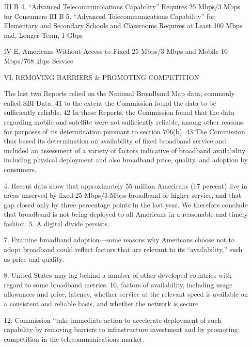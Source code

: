 III B 4. “Advanced Telecommunications Capability” Requires 25 Mbps/3 Mbps for
Consumers
III B 5. “Advanced Telecommunications Capability” for Elementary and Secondary Schools
and Classrooms Requires at Least 100 Mbps and, Longer-Term, 1 Gbps

IV E. Americans Without Access to Fixed 25 Mbps/3 Mbps and Mobile 10 Mbps/768 kbps
Service

VI. REMOVING BARRIERS & PROMOTING COMPETITION

The last two Reports
relied on the National Broadband Map data, commonly called SBI Data, 41 to the extent the Commission
found the data to be sufficiently reliable. 42 In these Reports, the Commission found that the data
regarding mobile and satellite were not sufficiently reliable, among other reasons, for purposes of its
determination pursuant to section 706(b). 43 The Commission thus based its determination on availability
of fixed broadband service and included an assessment of a variety of factors indicative of broadband
availability including physical deployment and also broadband price, quality, and adoption by
consumers.

4. Recent data show that approximately 55 million Americans (17 percent) live in areas unserved by fixed 25 Mbps/3 Mbps broadband or higher service, and that gap closed only by three percentage points in the last year. We therefore conclude that broadband is not being deployed to all Americans in a reasonable and timely fashion. 5. A digital divide persists.

7. Examine broadband adoption—some reasons why Americans choose not to adopt broadband could reflect factors that are relevant to its “availability,” such as price and quality. 

8. United States may lag behind a number of other developed countries with regard to some broadband metrics. 10. factors of availability, including usage allowances and price, latency, whether service at the relevant speed is available on a consistent and reliable basis, and whether the network is secure

12. Commission “take immediate action to accelerate deployment of such capability by removing barriers to infrastructure investment and by promoting competition in the telecommunications market.

